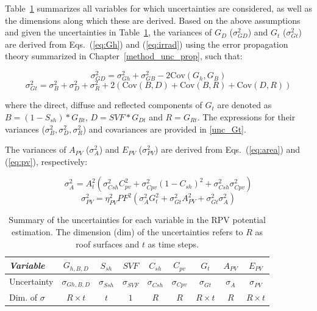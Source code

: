 Table~\ref{tab:uncs} summarizes all variables for which uncertainties are considered, as well as the dimensions along which these are derived.
Based on the above assumptions and given the uncertainties in Table~\ref{tab:uncs}, the variances of $G_D$ ($\sigma^2_{GD}$) and $G_t$ ($\sigma^2_{Gt}$) are derived from Eqs.~(\ref{eq:Gh}) and (\ref{eq:irrad}) using the error propagation theory summarized in Chapter~\ref{method_unc_prop}, such that:

\begin{equation}
\label{eq:unc_GD}
\sigma^2_{GD} = \sigma^2_{Gh} +  \sigma^2_{GB} - 2 \mathrm{Cov}(G_h, G_B) 
\end{equation}
%
\begin{equation}
\label{eq:irrad_unc}
\sigma^2_{Gt} = \sigma^2_{B} +  \sigma^2_{D} +  \sigma^2_{R} + 2 (\mathrm{Cov}(B, D) + \mathrm{Cov}(B, R) + \mathrm{Cov}(D, R))
\end{equation}

where the direct, diffuse and reflected components of $G_t$ are denoted as $B=(1 - S_{sh}) * G_{Bt}$, $D=\mathit{SVF} * G_{Dt}$ and $R=G_{Rt}$. The expressions for their variances ($\sigma^2_{B}, \sigma^2_{D}, \sigma^2_{R}$) and covariances are provided in \ref{unc_Gt}. 

The variances of $A_{PV}$ ($\sigma^2_A$) and $E_{PV}$ ($\sigma^2_{PV}$) are derived from Eqs.~(\ref{eq:area}) and (\ref{eq:pv}), respectively:

\begin{equation}
\label{eq:area_unc}
\sigma^2_{A}  = A_{t}^2 (\sigma^2_{\mathit{Csh}} C_{\mathit{pv}}^2 + \sigma^2_{\mathit{Cpv}} (1-C_{sh})^2 + \sigma^2_{\mathit{Csh}} \sigma^2_{\mathit{Cpv}}) 
\end{equation}
%
\begin{equation}
\label{eq:pv_unc}
\sigma^2_{PV}  = \eta_{PV}^2 \mathit{PF}^2 (\sigma^2_{A} G_{t}^2 + \sigma^2_{Gt} A_{PV}^2 + \sigma^2_{Gt} \sigma^2_{A}) 
\end{equation}

\begin{table}[tb]
\centering
\footnotesize
\caption{Summary of the uncertainties for each variable in the RPV potential estimation. The dimension (dim) of the uncertainties refers to $R$ as roof surfaces and $t$ as time steps.}
\label{tab:uncs}
\begin{tabular} {lcccccccc}
\hline 
\textit{Variable}  & $G_{h,B,D}$  & $S_{sh}$  & $\mathit{SVF}$ & $C_{sh}$ & $C_{\mathit{pv}}$ & $G_t$  & $A_{PV}$ & $E_{PV}$                  \\
\hline 
Uncertainty    & $\sigma_{Gh,B,D}$    & $\sigma_{\mathit{Ssh}}$     & $\sigma_{\mathit{SVF}}$     & $\sigma_{\mathit{Csh}}$  & $\sigma_{\mathit{Cpv}}$    & $\sigma_{Gt}$   & $\sigma_{A}$     & $\sigma_{PV}$                     \\
Dim. of $\sigma$ & $R \times t$ & $t$ & $1$   & $R$     & $R$     & $R \times t$ & $R$    & $R \times t$ \\
\hline 
\end{tabular}
\end{table}


